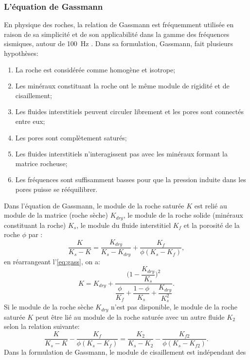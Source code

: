 \subsubsection{L'équation de Gassmann}
En physique des roches, la relation de Gassmann \citep{Gassmann} est fréquemment
utilisée en raison de sa simplicité et de son applicabilité dans la gamme des fréquences
sismiques, autour de \SI{100}{\hertz} \citep{Mavko2009}. Dans sa formulation,
Gassmann, fait plusieurs hypothèses:
\begin{enumerate}
\item La roche est considérée comme homogène et isotrope;
\item Les minéraux constituant la roche ont le même module de rigidité et de
cisaillement;
\item Les fluides interstitiels peuvent circuler librement et les pores sont
connectés entre eux;
\item Les pores sont complètement saturés;
\item Les fluides interstitiels n'interagissent pas avec les minéraux formant la matrice rocheuse;
\item Les fréquences sont suffisamment basses pour que la pression induite dans
les pores puisse se rééquilibrer.
\end{enumerate}
Dans l’équation de Gassmann, le module de la roche saturée $K$ est relié au
module de la matrice (roche sèche) $K_{dry}$, le module de la roche solide
(minéraux constituant la roche) $K_s$, le module du fluide interstitiel $K_f$ et
la porosité de la roche $\phi$ par \citep{Mavko2009}:
\begin{equation}
\dfrac{K}{K_s - K} = \dfrac{K_{dry}}{K_s - K_{dry}} + \dfrac{K_f}{\phi (K_s -
K_f)},
\label{eq:gass}
\end{equation}
en réarrangeant l'\cref{eq:gass}, on a:
\begin{equation}
K = K_{dry} + \dfrac{\bigg(1 -
\dfrac{K_{dry}}{K_s}\bigg)^2}{\dfrac{\phi}{K_f}+\dfrac{1-\phi}{K_s} +
\dfrac{K_{dry}}{K_s^2}}.
\label{eq:gasmmann}
\end{equation}
Si le module de la roche sèche $K_{dry}$ n'est pas disponible, le module de la
roche saturée  $K$ peut être lié au module de la roche saturée avec un autre
fluide $K_2$ selon la relation suivante\citep{Mavko2009}:
\begin{equation}
\dfrac{K}{K_s - K} - \dfrac{K_{f}}{\phi(K_s - K_{f})} = \dfrac{K_2}{K_s - K_2} -
\dfrac{K_{f2}}{\phi(K_s - K_{f2})}.
\end{equation}
Dans la formulation de Gassmann, le module de cisaillement est indépendant des
